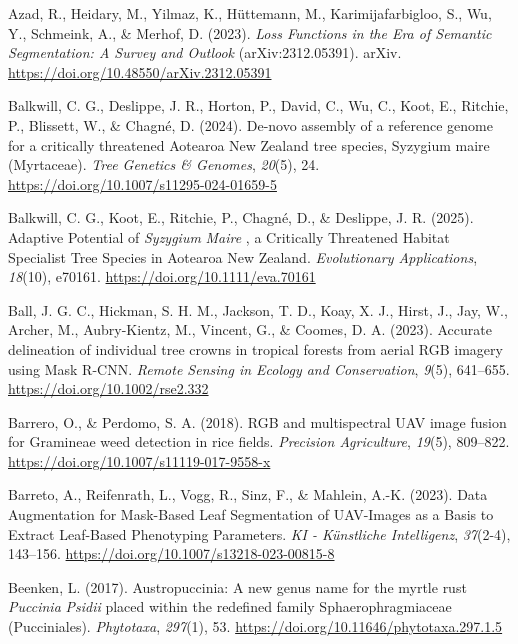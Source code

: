 \documentclass[
]{scrreprt}
\newlength{\cslhangindent}
\newenvironment{CSLReferences}[2] %
 {\begin{list}{}{%
  \setlength{\itemindent}{0pt}
  \setlength{\leftmargin}{0pt}
  \setlength{\parsep}{0pt}
  \setlength{\baselineskip}{12pt}
  \ifodd #1
   \setlength{\leftmargin}{\cslhangindent}
   \setlength{\itemindent}{-1\cslhangindent}
  \fi
  \setlength{\itemsep}{4pt}}}
 {\end{list}}
\begin{document}
\begin{CSLReferences}{1}{0}
Azad, R., Heidary, M., Yilmaz, K., Hüttemann, M., Karimijafarbigloo, S.,
Wu, Y., Schmeink, A., \& Merhof, D. (2023). \emph{Loss {Functions} in
the {Era} of {Semantic Segmentation}: {A Survey} and {Outlook}}
(arXiv:2312.05391). arXiv.
\url{https://doi.org/10.48550/arXiv.2312.05391}

Balkwill, C. G., Deslippe, J. R., Horton, P., David, C., Wu, C., Koot,
E., Ritchie, P., Blissett, W., \& Chagné, D. (2024). De-novo assembly of
a reference genome for a critically threatened {Aotearoa New Zealand}
tree species, {Syzygium} maire ({Myrtaceae}). \emph{Tree Genetics \&
Genomes}, \emph{20}(5), 24.
\url{https://doi.org/10.1007/s11295-024-01659-5}

Balkwill, C. G., Koot, E., Ritchie, P., Chagné, D., \& Deslippe, J. R.
(2025). Adaptive {Potential} of {\emph{Syzygium}}{ \emph{Maire}} , a
{Critically Threatened Habitat Specialist Tree Species} in {Aotearoa New
Zealand}. \emph{Evolutionary Applications}, \emph{18}(10), e70161.
\url{https://doi.org/10.1111/eva.70161}

Ball, J. G. C., Hickman, S. H. M., Jackson, T. D., Koay, X. J., Hirst,
J., Jay, W., Archer, M., Aubry-Kientz, M., Vincent, G., \& Coomes, D. A.
(2023). Accurate delineation of individual tree crowns in tropical
forests from aerial {\textsc{RGB}} imagery using {Mask}
{\textsc{R}}{\textsc{-}}{\textsc{CNN}}. \emph{Remote Sensing in Ecology
and Conservation}, \emph{9}(5), 641--655.
\url{https://doi.org/10.1002/rse2.332}

Barrero, O., \& Perdomo, S. A. (2018). {RGB} and multispectral {UAV}
image fusion for {Gramineae} weed detection in rice fields.
\emph{Precision Agriculture}, \emph{19}(5), 809--822.
\url{https://doi.org/10.1007/s11119-017-9558-x}

Barreto, A., Reifenrath, L., Vogg, R., Sinz, F., \& Mahlein, A.-K.
(2023). Data {Augmentation} for {Mask-Based Leaf Segmentation} of
{UAV-Images} as a {Basis} to {Extract Leaf-Based Phenotyping
Parameters}. \emph{KI - Künstliche Intelligenz}, \emph{37}(2-4),
143--156. \url{https://doi.org/10.1007/s13218-023-00815-8}

Beenken, L. (2017). Austropuccinia: A new genus name for the myrtle rust
{\emph{Puccinia}}{ \emph{Psidii}} placed within the redefined family
{Sphaerophragmiaceae} ({Pucciniales}). \emph{Phytotaxa}, \emph{297}(1),
53. \url{https://doi.org/10.11646/phytotaxa.297.1.5}


\end{CSLReferences}
\end{document}
